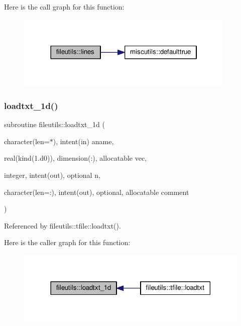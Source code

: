 Here is the call graph for this function\+:
\nopagebreak
\begin{figure}[H]
\begin{center}
\leavevmode
\includegraphics[width=298pt]{namespacefileutils_a55dce72f20c256d70de9529936f7ebd8_cgraph}
\end{center}
\end{figure}
\mbox{\label{namespacefileutils_ac5c5aa9cef807fcc118234407f98b422}} 
\subsubsection{\texorpdfstring{loadtxt\+\_\+1d()}{loadtxt\_1d()}}
{\footnotesize\ttfamily subroutine fileutils\+::loadtxt\+\_\+1d (\begin{DoxyParamCaption}\item[{character(len=$\ast$), intent(in)}]{aname,  }\item[{real(kind(1.d0)), dimension(\+:), allocatable}]{vec,  }\item[{integer, intent(out), optional}]{n,  }\item[{character(len=\+:), intent(out), optional, allocatable}]{comment }\end{DoxyParamCaption})\hspace{0.3cm}{\ttfamily [private]}}



Referenced by fileutils\+::tfile\+::loadtxt().

Here is the caller graph for this function\+:
\nopagebreak
\begin{figure}[H]
\begin{center}
\leavevmode
\includegraphics[width=318pt]{namespacefileutils_ac5c5aa9cef807fcc118234407f98b422_icgraph}
\end{center}
\end{figure}
\mbox{\label{namespacefileutils_aefd4b6f83e21fff9ab97894279daaecb}} 
